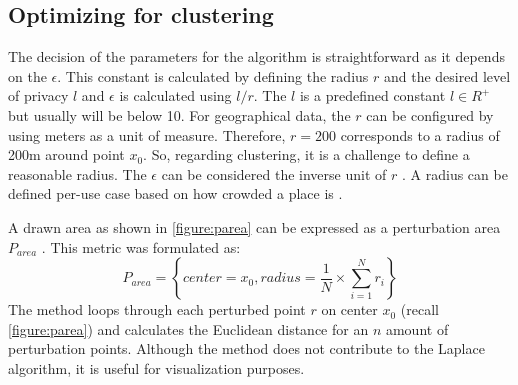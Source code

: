 \subsection{Optimizing for clustering}
The decision of the parameters for the algorithm is straightforward as it depends on the $\epsilon$. \label{paragraph:choosing-r}
This constant is calculated by defining the radius $r$ and the desired level of privacy $l$ and $\epsilon$ is calculated using $l/r$.
The $l$ is a predefined constant $l \in R^+$ but usually will be below 10.
For geographical data, the $r$ can be configured by using meters as a unit of measure.
Therefore, $r = 200$ corresponds to a radius of 200m around point $x_0$.
So, regarding clustering, it is a challenge to define a reasonable radius. \newline
The $\epsilon$ can be considered the inverse unit of $r$ \citep{DBLP:journals/corr/abs-1212-1984}.
A radius can be defined per-use case based on how crowded a place is \citep{chatzikokolakis_constructing_2015}.

A drawn area as shown in \ref{figure:parea} can be expressed as a perturbation area $P_{area}$ \citep{yan_perturb_2022-2}.
This metric was formulated as:
\begin{equation}
  P_{area}=\left\{ center = x_{0},radius = \frac{1}{N}\times \sum _{i=1}^{N}r_{i}\right\}
\end{equation}
The method loops through each perturbed point $r$ on center $x_0$ (recall \ref{figure:parea}) and calculates the Euclidean distance for an $n$ amount of perturbation points.
Although the method does not contribute to the Laplace algorithm, it is useful for visualization purposes.
\newpage